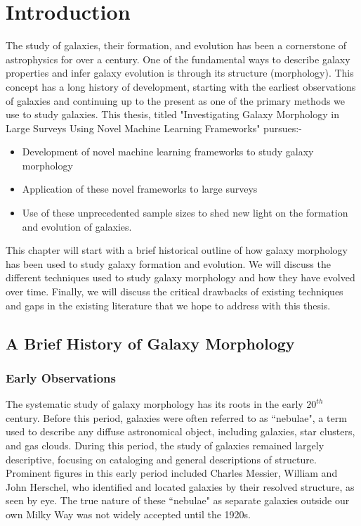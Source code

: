 \chapter{Introduction} \label{chap:intro}

The study of galaxies, their formation, and evolution has been a cornerstone of astrophysics for over a century. One of the fundamental ways to describe galaxy properties and infer galaxy evolution is through its structure (morphology). This concept has a long history of development, starting with the earliest observations of galaxies and continuing up to the present as one of the primary methods we use to study galaxies. This thesis, titled "Investigating Galaxy Morphology in Large Surveys Using Novel Machine Learning Frameworks" pursues:-

\begin{itemize}
    \item Development of novel machine learning frameworks to study galaxy morphology
    \item Application of these novel frameworks to large surveys
    \item Use of these unprecedented sample sizes to shed new light on the formation and evolution of galaxies. 
\end{itemize}

This chapter will start with a brief historical outline of how galaxy morphology has been used to study galaxy formation and evolution. We will discuss the different techniques used to study galaxy morphology and how they have evolved over time. Finally, we will discuss the critical drawbacks of existing techniques and gaps in the existing literature that we hope to address with this thesis. 

\section{A Brief History of Galaxy Morphology} \label{sec_intro:history}

\subsection{Early Observations} \label{sec_intro:early_obs}

The systematic study of galaxy morphology has its roots in the early $20^{th}$ century. Before this period, galaxies were often referred to as ``nebulae", a term used to describe any diffuse astronomical object, including galaxies, star clusters, and gas clouds. During this period, the study of galaxies remained largely descriptive, focusing on cataloging and general descriptions of structure. Prominent figures in this early period included Charles Messier, William and John Herschel, who identified and located galaxies by their resolved structure, as seen by eye. The true nature of these ``nebulae" as separate galaxies outside our own Milky Way was not widely accepted until the 1920s.

